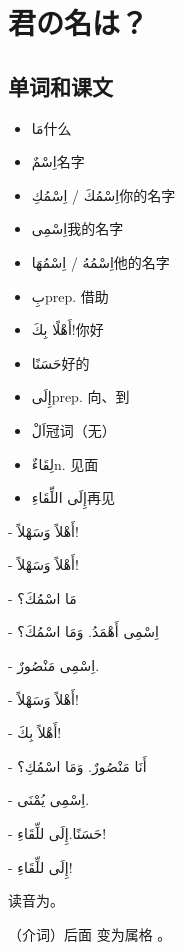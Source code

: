 \chapter{君の名は？}

\section{ 单词和课文}

\begin{multicols}{2}
    \begin{itemize}
        \item \ac{مَا}{什么}
        \item \ac{اِسْمٌ}{名字}
        \item \ac{اِسْمُكَ / اِسْمُكِ}{你的名字}
        \item \ac{اِسْمِى}{我的名字}
        \item \ac{اِسْمُهُ / اِسْمُهَا}{他的名字}
        \item \ac{بِ}{prep. 借助}
        \item \ac{أَهْلًا بِكَ!}{你好}
        \item \ac{حَسَنًا}{好的}
        \item \ac{إِلَى}{prep. 向、到}
        \item \ac{اَلْ}{冠词（无）}
        \item \ac{لِقَاءٌ}{n. 见面}
        \item \ac{إِلَى اللِّقَاءِ}{再见}
    \end{itemize}
\end{multicols}


\begin{Arabic}
    - أَهْلاً وَسَهْلاً! 

    - أَهْلاً وَسَهْلاً!

    - مَا اسْمُكَ؟

    - اِسْمِى أَهْمَدُ. وَمَا اسْمُكَ؟

    - اِسْمِى مَنْصُورٌ.

    - أَهْلاً وَسَهْلاً!

    - أَهْلاً بِكَ!

    - أَنَا مَنْصُورٌ. وَمَا اسْمُكِ؟

    - اِسْمِى يُمْنَى.

    - حَسَنًا.إِلَى للِّقَاءِ!

    - إِلَى للِّقَاءِ! 
\end{Arabic}

\begin{attention}
     读音为。

     （介词）后面  变为属格  。
\end{attention}

